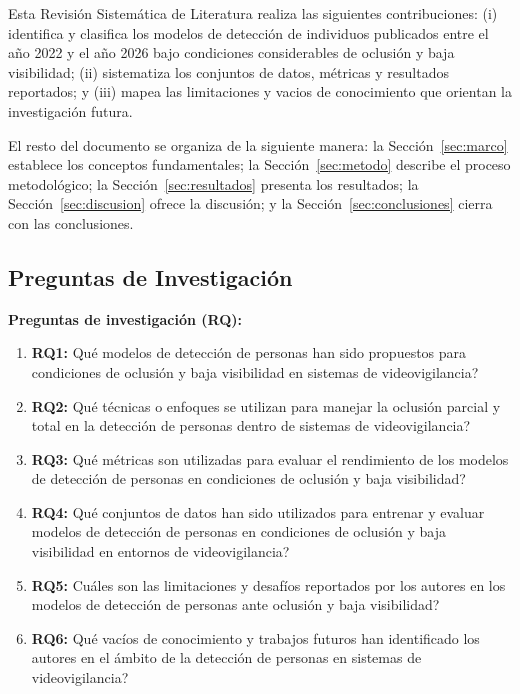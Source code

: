 \documentclass[12pt, a4paper]{article}
\begin{document}
Esta Revisi\'{o}n Sistem\'{a}tica de Literatura realiza las siguientes
contribuciones: (i) identifica y clasifica los modelos de detecci\'{o}n
de individuos publicados entre el a\~{n}o 2022 y el a\~{n}o 2026 bajo condiciones considerables de
oclusi\'{o}n y baja visibilidad; (ii) sistematiza los conjuntos de
datos, m\'{e}tricas y resultados reportados; y (iii) mapea las
limitaciones y vacios de conocimiento que orientan la investigaci\'{o}n
futura.

El resto del documento se organiza de la siguiente manera: la
Secci\'{o}n~\ref{sec:marco} establece los conceptos fundamentales; la
Secci\'{o}n~\ref{sec:metodo} describe el proceso metodol\'{o}gico; la
Secci\'{o}n~\ref{sec:resultados} presenta los resultados; la
Secci\'{o}n~\ref{sec:discusion} ofrece la discusi\'{o}n; y la
Secci\'{o}n~\ref{sec:conclusiones} cierra con las conclusiones.

\subsection*{Preguntas de Investigaci\'{o}n}

\textbf{Preguntas de investigaci\'{o}n (RQ):}
\begin{enumerate}
  \item \textbf{RQ1:} \textquestiondown Qu\'{e} modelos de detecci\'{o}n
        de personas han sido propuestos para condiciones de oclusi\'{o}n
        y baja visibilidad en sistemas de videovigilancia?
  \item \textbf{RQ2:} \textquestiondown Qu\'{e} t\'{e}cnicas o enfoques
        se utilizan para manejar la oclusi\'{o}n parcial y total en la
        detecci\'{o}n de personas dentro de sistemas de videovigilancia?
  \item \textbf{RQ3:} \textquestiondown Qu\'{e} m\'{e}tricas son
        utilizadas para evaluar el rendimiento de los modelos de
        detecci\'{o}n de personas en condiciones de oclusi\'{o}n y baja
        visibilidad?
  \item \textbf{RQ4:} \textquestiondown Qu\'{e} conjuntos de datos han
        sido utilizados para entrenar y evaluar modelos de detecci\'{o}n
        de personas en condiciones de oclusi\'{o}n y baja visibilidad en
        entornos de videovigilancia?
  \item \textbf{RQ5:} \textquestiondown Cu\'{a}les son las limitaciones
        y desaf\'{i}os reportados por los autores en los modelos de
        detecci\'{o}n de personas ante oclusi\'{o}n y baja visibilidad?
  \item \textbf{RQ6:} \textquestiondown Qu\'{e} vac\'{i}os de
        conocimiento y trabajos futuros han identificado los autores en
        el \'{a}mbito de la detecci\'{o}n de personas en sistemas de
        videovigilancia?
\end{enumerate}
\end{document}
